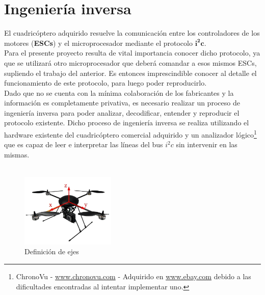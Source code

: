 \documentclass[main]{subfiles}
\begin{document}
\chapter{Ingenier\'ia inversa}
\label{chap:ingenieria-inversa}

El cuadric\'optero adquirido resuelve la comunicaci\'on entre los controladores de los motores (\textbf{ESCs}) y el microprocesador mediante el protocolo $\mathbf{i^2c}$.\\

Para el presente proyecto resulta de vital importancia conocer dicho protocolo, ya que se utilizar\'a otro microprocesador que deber\'a comandar a esos mismos ESCs, supliendo el trabajo del anterior. Es entonces imprescindible conocer al detalle el funcionamiento de este protocolo, para luego poder reproducirlo.\\

Dado que no se cuenta con la mínima colaboraci\'on de los fabricantes y la informaci\'on es completamente privativa, es necesario realizar un proceso de ingenier\'ia inversa para poder analizar, decodificar, entender y reproducir el protocolo existente. Dicho proceso de ingenier\'ia inversa se realiza utilizando el hardware existente del cuadric\'optero comercial adquirido y un analizador l\'ogico\footnote{ChronoVu - \url{www.chronovu.com} - Adquirido en \url{www.ebay.com} debido a las dificultades encontradas al intentar implementar uno.} que es capaz de leer e interpretar las l\'ineas del bus $i^2c$ sin intervenir en las mismas.\\ \\

\begin{figure}
	\vspace{-40pt}
	\begin{center}
	\includegraphics[width=0.4\textwidth]{./pics_sniffer/ejes_quad.jpg}
	\end{center}
	\vspace{-20pt}
	\caption{Definici\'on de ejes}
	\label{fig:ejes_quad}
	\vspace{-70pt}
\end{figure}
\end{document}
